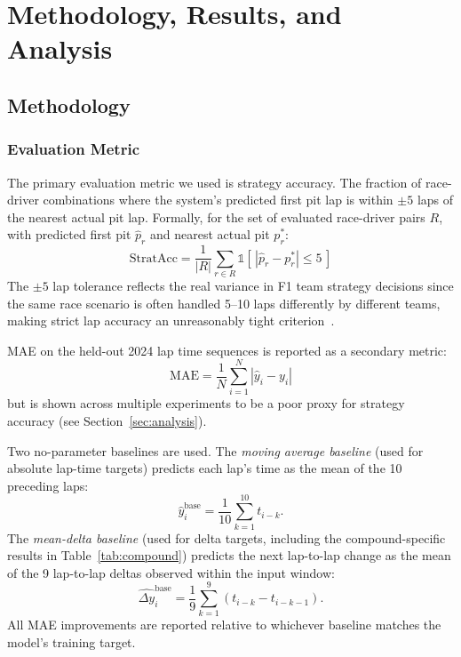 \section{Methodology, Results, and Analysis}\label{sec:results}

\subsection{Methodology}

\subsubsection{Evaluation Metric}

The primary evaluation metric we used is strategy accuracy. The fraction of race-driver combinations where the system's predicted 
first pit lap is within $\pm 5$ laps of the nearest actual pit lap. Formally, for the set of evaluated race-driver pairs $R$, 
with predicted first pit $\hat{p}_r$ and nearest actual pit $p_r^*$:
\begin{equation}
\text{StratAcc} = \frac{1}{|R|}\sum_{r \in R}\mathbb{1}\!\left[\,|\hat{p}_r - p_r^*| \leq 5\,\right]
\end{equation}
The $\pm 5$ lap tolerance reflects the real variance in F1 team strategy decisions since the same race scenario is often handled 5--10 
laps differently by different teams, making strict lap accuracy an unreasonably tight criterion~\cite{heilmeier2020}.

MAE on the held-out 2024 lap time sequences is reported as a secondary metric:
\begin{equation}
\text{MAE} = \frac{1}{N}\sum_{i=1}^{N}|\hat{y}_i - y_i|
\end{equation}
but is shown across multiple experiments to be a poor proxy for strategy accuracy (see Section~\ref{sec:analysis}).

Two no-parameter baselines are used. The \textit{moving average baseline} (used for absolute lap-time targets) predicts each lap's time as the mean of the 10 preceding laps:
\begin{equation}
\hat{y}_i^\text{base} = \frac{1}{10}\sum_{k=1}^{10} t_{i-k}.
\end{equation}
The \textit{mean-delta baseline} (used for delta targets, including the compound-specific results in Table~\ref{tab:compound}) predicts the next lap-to-lap change as the mean of the 9 lap-to-lap deltas observed within the input window:
\begin{equation}
\widehat{\Delta y}_i^\text{base} = \frac{1}{9}\sum_{k=1}^{9} (t_{i-k} - t_{i-k-1}).
\end{equation}
All MAE improvements are reported relative to whichever baseline matches the model's training target.

